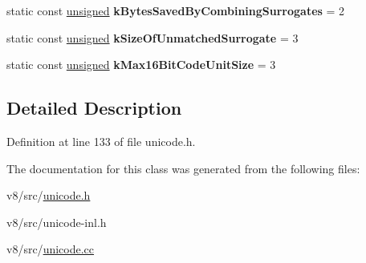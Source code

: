 \begin{DoxyCompactItemize}
static const \mbox{\hyperlink{classunsigned}{unsigned}} {\bfseries k\+Bytes\+Saved\+By\+Combining\+Surrogates} = 2
\item 
\mbox{\label{classunibrow_1_1Utf8_ae299e468227458f62545d61201a256eb}} 
static const \mbox{\hyperlink{classunsigned}{unsigned}} {\bfseries k\+Size\+Of\+Unmatched\+Surrogate} = 3
\item 
\mbox{\label{classunibrow_1_1Utf8_ac950664b85f1ad13505134334f32d0c5}} 
static const \mbox{\hyperlink{classunsigned}{unsigned}} {\bfseries k\+Max16\+Bit\+Code\+Unit\+Size} = 3
\end{DoxyCompactItemize}


\subsection{Detailed Description}


Definition at line 133 of file unicode.\+h.



The documentation for this class was generated from the following files\+:\begin{DoxyCompactItemize}
\item 
v8/src/\mbox{\hyperlink{unicode_8h}{unicode.\+h}}\item 
v8/src/unicode-\/inl.\+h\item 
v8/src/\mbox{\hyperlink{unicode_8cc}{unicode.\+cc}}\end{DoxyCompactItemize}
